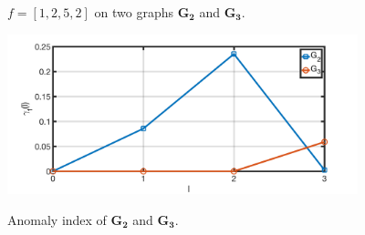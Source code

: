 \begin{figure}[t]
	\centering
	\caption{$f=[1,2,5,2]$ on two graphs $\mathbf{G_2}$ and $\mathbf{G_3}$.}
	\label{fig:f_on_g}
\end{figure}

\begin{figure}[t]
	\centering
    {
		\includegraphics[width= 4in] {figures/new_graph.png}
		\label{fig:distribution2}
	}
	\caption{Anomaly index of $\mathbf{G_2}$ and $\mathbf{G_3}$.}
	\label{fig:new_graph}
\end{figure}




